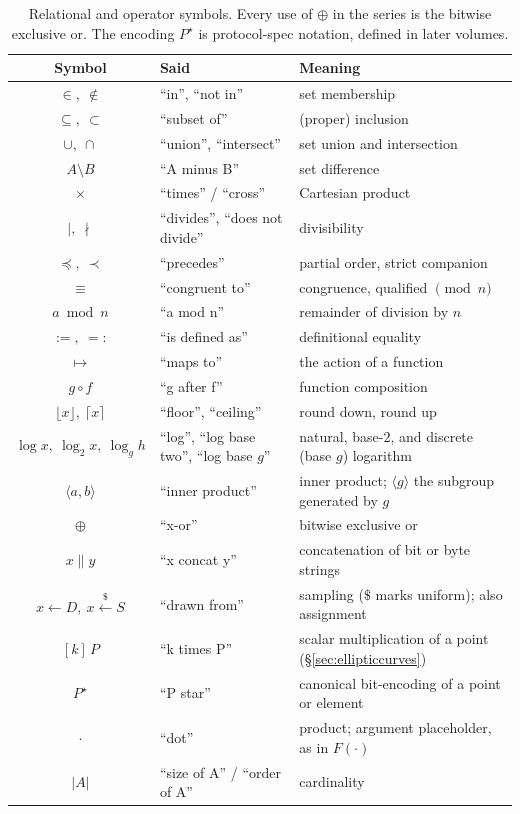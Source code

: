 \documentclass[11pt,a4paper]{article}
\theoremstyle{definition}
\theoremstyle{remark}
\begin{document}
\begin{table}[htp]
\centering
\small
\setlength{\tabcolsep}{3pt}
\begin{tabular}{@{}cll@{}}
\toprule
Symbol & Said & Meaning \\
\midrule
\(\in,\ \notin\) & ``in'', ``not in'' & set membership \\
\(\subseteq,\ \subset\) & ``subset of'' & (proper) inclusion \\
\(\cup,\ \cap\) & ``union'', ``intersect'' & set union and intersection \\
\(A \setminus B\) & ``A minus B'' & set difference \\
\(\times\) & ``times'' / ``cross'' & Cartesian product \\
\(\mid,\ \nmid\) & ``divides'', ``does not divide'' & divisibility \\
\(\preceq,\ \prec\) & ``precedes'' & partial order, strict companion \\
\(\equiv\) & ``congruent to'' & congruence, qualified \(\pmod{n}\) \\
\(a \bmod n\) & ``a mod n'' & remainder of division by \(n\) \\
\(:=,\ =:\) & ``is defined as'' & definitional equality \\
\(\mapsto\) & ``maps to'' & the action of a function \\
\(g \circ f\) & ``g after f'' & function composition \\
\(\lfloor x\rfloor,\ \lceil x\rceil\) & ``floor'', ``ceiling''
  & round down, round up \\
\(\log x,\ \log_2 x,\ \log_g h\) & ``log'', ``log base two'', ``log base \(g\)''
  & natural, base-\(2\), and discrete (base \(g\)) logarithm \\
\(\langle a, b\rangle\) & ``inner product''
  & inner product; \(\langle g\rangle\) the subgroup generated by \(g\) \\
\(\oplus\) & ``x-or'' & bitwise exclusive or \\
\(x \mathbin{\|} y\) & ``x concat y'' & concatenation of bit or byte strings \\
\(x \gets D,\ x \xleftarrow{\$} S\) & ``drawn from'' & sampling (\(\$\) marks
  uniform); also assignment \\
\([k]\,P\) & ``k times P'' & scalar multiplication of a point
  (\S\ref{sec:ellipticcurves}) \\
\(P^\star\) & ``P star'' & canonical bit-encoding of a point or element \\
\(\cdot\) & ``dot'' & product; argument placeholder, as in \(F(\cdot)\) \\
\(\lvert A\rvert\) & ``size of A'' / ``order of A'' & cardinality \\
\bottomrule
\end{tabular}
\caption{Relational and operator symbols. Every use of \(\oplus\) in the
series is the bitwise exclusive or. The
encoding \(P^\star\) is protocol-spec notation, defined in later
volumes.}
\label{tab:notation-ops}
\end{table}
\end{document}
